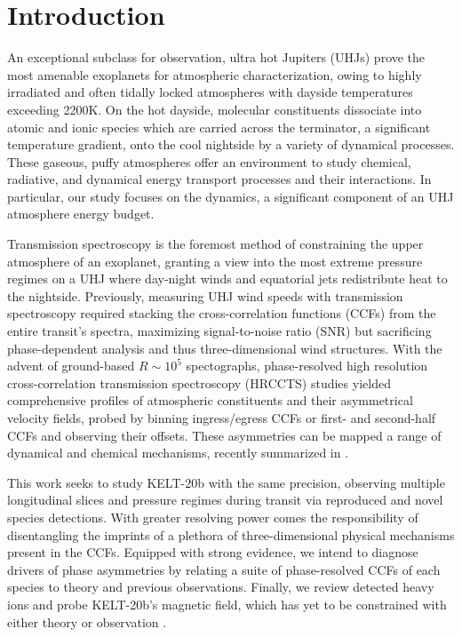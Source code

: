 \documentclass[twocolumn]{aastex631}
\begin{document}
    \keywords{}


    \section{Introduction}\label{sec:intro}

        An exceptional subclass for observation, ultra hot Jupiters (UHJs) prove the most amenable exoplanets for atmospheric characterization, owing to highly irradiated and often tidally locked atmospheres with dayside temperatures exceeding 2200K. On the hot dayside, molecular constituents dissociate into atomic and ionic species which are carried across the terminator, a significant temperature gradient, onto the cool nightside by a variety of dynamical processes. These gaseous, puffy atmospheres offer an environment to study chemical, radiative, and dynamical energy transport processes and their interactions. In particular, our study focuses on the dynamics, a significant component of an UHJ atmosphere energy budget.

        Transmission spectroscopy is the foremost method of constraining the upper atmosphere of an exoplanet, granting a view into the most extreme pressure regimes on a UHJ where day-night winds and equatorial jets redistribute heat to the nightside. Previously, measuring UHJ wind speeds with transmission spectroscopy required stacking the cross-correlation functions (CCFs) from the entire transit's spectra, maximizing signal-to-noise ratio (SNR) but sacrificing phase-dependent analysis and thus three-dimensional wind structures\citep{MillerRicciKempton2012}. With the advent of ground-based $R \sim 10^{5}$ spectographs, phase-resolved high resolution cross-correlation transmission spectroscopy (HRCCTS) studies yielded comprehensive profiles of atmospheric constituents and their asymmetrical velocity fields, probed by binning ingress/egress CCFs or first- and second-half CCFs and observing their offsets. These asymmetries can be mapped a range of dynamical and chemical mechanisms, recently summarized in \citet{Savel2023}.

        This work seeks to study KELT-20b with the same precision, observing multiple longitudinal slices and pressure regimes during transit via reproduced and novel species detections.
        With greater resolving power comes the responsibility of disentangling the imprints of a plethora of three-dimensional physical mechanisms present in the CCFs. Equipped with strong evidence, we intend to diagnose drivers of phase asymmetries by relating a suite of phase-resolved CCFs of each species to theory and previous observations. Finally, we review detected heavy ions and probe KELT-20b's magnetic field, which has yet to be constrained with either theory or observation \citep{Savel2024}.
        
\end{document}

